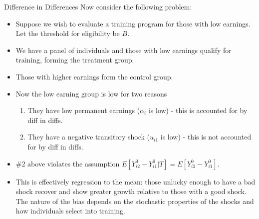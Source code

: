 \begin{frame}{Difference in Differences}
  Now consider the following problem:
  \begin{itemize}
  \item Suppose we wish to evaluate a training program for those with low
  earnings. Let the threshold for eligibility be $B$.
  \item We have a panel of individuals and those with low earnings qualify for
  training, forming the treatment group.
  \item Those with higher earnings form the control group. 
  \item Now the low earning group is low for two reasons
  \begin{enumerate}
  \item They have low permanent earnings ($\alpha_i$ is low) - this is accounted for by diff in diffs.
  \item They have a negative transitory shock ($u_{i1}$ is low) - this is not accounted for by diff in diffs.
  \end{enumerate} 
  \item \#2 above violates the assumption {\small $E[Y_{i2}^0 - Y_{i1}^0 | T] = E[Y_{i2}^0 - Y_{i1}^0]$}. 
  \item This is effectively regression to the mean: those unlucky enough to have a bad shock recover and show greater growth relative to those with a good shock. The nature of the bias depends on the stochastic properties of the shocks and how individuals select into training.
  \end{itemize}
  \end{frame} 
  
